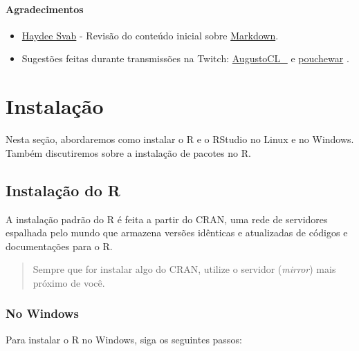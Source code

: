\documentclass[
]{book}
\begin{document}
\hypertarget{agradecimentos}{%
\subsubsection*{Agradecimentos}\label{agradecimentos}}

\begin{itemize}
\item
  \href{https://www.linkedin.com/in/hsvab}{Haydee Svab} - Revisão do conteúdo inicial sobre \protect\hyperlink{markdown}{Markdown}.
\item
  Sugestões feitas durante transmissões na Twitch: \href{https://www.twitch.tv/AugustoCL_/about}{AugustoCL\_} e \href{https://www.twitch.tv/pouchewar/about}{pouchewar} .
\end{itemize}

\hypertarget{instalacao}{%
\chapter{Instalação}\label{instalacao}}

Nesta seção, abordaremos como instalar o R e o RStudio no Linux e no Windows. Também discutiremos sobre a instalação de pacotes no R.

\hypertarget{instalacao-do-r}{%
\section{Instalação do R}\label{instalacao-do-r}}

A instalação padrão do R é feita a partir do CRAN, uma rede de servidores espalhada pelo mundo que armazena versões idênticas e atualizadas de códigos e documentações para o R.

\begin{quote}
Sempre que for instalar algo do CRAN, utilize o servidor (\emph{mirror}) mais próximo de você.
\end{quote}

\hypertarget{no-windows}{%
\subsection{No Windows}\label{no-windows}}

Para instalar o R no Windows, siga os seguintes passos:
\end{document}
